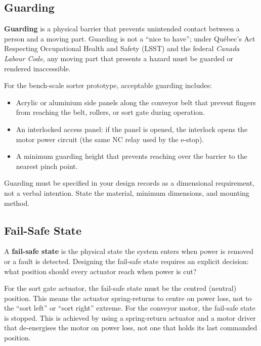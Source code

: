 \subsection{Guarding}
\label{sec:ch9-robot-guarding}

\textbf{Guarding} is a physical barrier that prevents unintended
contact between a person and a moving part.
Guarding is not a ``nice to have''; under Qu\'{e}bec's Act Respecting Occupational
Health and Safety (LSST) and the federal \textit{Canada Labour Code}, any moving
part that presents a hazard must be guarded or rendered inaccessible.

For the bench-scale sorter prototype, acceptable guarding includes:
\begin{itemize}
  \item Acrylic or aluminium side panels along the conveyor belt that prevent
        fingers from reaching the belt, rollers, or sort gate during operation.
  \item An interlocked access panel: if the panel is opened, the interlock opens
        the motor power circuit (the same NC relay used by the e-stop).
  \item A minimum guarding height that prevents reaching over the barrier to the
        nearest pinch point.
\end{itemize}

Guarding must be specified in your design records as a dimensional requirement,
not a verbal intention.
State the material, minimum dimensions, and mounting method.

\subsection{Fail-Safe State}
\label{sec:ch9-robot-failsafe}

A \textbf{fail-safe state} is the physical state the
system enters when power is removed or a fault is detected.
Designing the fail-safe state requires an explicit decision: what position should
every actuator reach when power is cut?

For the sort gate actuator, the fail-safe state must be the centred (neutral)
position.
This means the actuator spring-returns to centre on power loss, not to the
``sort left'' or ``sort right'' extreme.
For the conveyor motor, the fail-safe state is stopped.
This is achieved by using a spring-return actuator and a motor driver that
de-energises the motor on power loss, not one that holds its last commanded
position.


